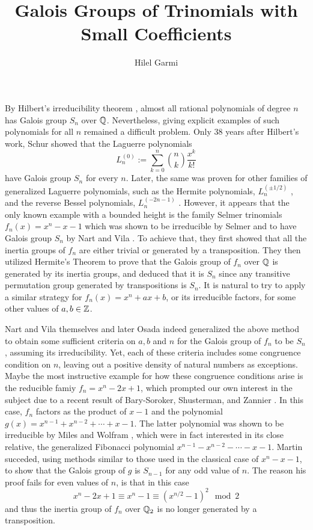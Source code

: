 \documentclass[../../main.tex]{subfiles}
\begin{document}
\title{
  Galois Groups of Trinomials with Small Coefficients
}
\author{Hilel Garmi}
\maketitle
By Hilbert's irreducibility theorem \cite{Hilbert}, almost all rational polynomials of degree $n$ has Galois group $S_n$ over $\mathbb{Q}$.
Nevertheless, giving explicit examples of such polynomials for all $n$ remained a difficult problem.
Only 38 years after Hilbert's work, Schur \cite{schur1931affectless} showed that the Laguerre polynomials 
\[
  L_n^{\left( 0 \right)} := \sum_{k=0}^n \binom{n}{k} \frac{x^k}{k!}
\]
have Galois group $S_n$ for every $n$.
Later, the same was proven for other families of generalized Laguerre polynomials, such as the Hermite polynomials, $L^{\left( \pm 1/2 \right)}_n$ \cite{schur1931affectless}, and the reverse Bessel polynomials, $L^{\left( -2n-1 \right)}_n$ \cite{grosswald1978bessel} \cite{filaseta2002irreducibility}.
However, it appears that the only known example with a bounded height is the family Selmer trinomials $f_n\left( x \right) = x^n - x - 1$  which was shown to be irreducible by Selmer \cite{SelmerIrreducibility1956} and to have Galois group $S_n$ by Nart and Vila \cite{NartVila1979}.
To achieve that, they first showed that all the inertia groups of $f_n$ are either trivial or generated by a transposition.
They then utilized Hermite's Theorem to prove that the Galois group of $f_n$ over $\mathbb{Q}$ is generated by its inertia groups, and deduced that it is $S_n$ since any transitive permutation group generated by transpositions is $S_n$.
It is natural to try to apply a similar strategy for $f_n\left( x \right) = x^n + ax + b$, or its irreducible factors, for some other values of $a,b \in \mathbb{Z}$.

Nart and Vila \cite{NartVila1979} themselves and later Osada \cite{Osada1987TheGG} indeed generalized the above method to obtain some sufficient criteria on $a,b$ and $n$ for the Galois group of $f_n$ to be $S_n$, assuming its irreducibility.
Yet, each of these criteria includes some congruence condition on $n$, leaving out a positive density of natural numbers as exceptions.
Maybe the most instructive example for how these congruence conditions arise is the  reducible famiy $f_n = x^n - 2x + 1$, which prompted our own interest in the subject due to a recent result of Bary-Soroker, Shusterman, and Zannier \cite[Appendix A]{Soroker_appendix_2017}.
In this case, $f_n$ factors as the product of $x-1$ and the polynomial $g\left( x \right) = x^{n-1} + x^{n-2} + \cdots + x - 1$.
The latter polynomial was shown to be irreducible by Miles \cite{Miles1960} and Wolfram \cite{Wolfram1998}, which were in fact interested in its close relative, the generalized Fibonacci polynomial $x^{n-1} - x^{n-2} - \cdots - x - 1$.
Martin \cite{MARTIN2004213} succeded, using methods similar to those used in the classical case of $x^n - x - 1$, to show that the Galois group of $g$ is $S_{n-1}$ for any odd value of $n$.
The reason his proof fails for even values of $n$, is that in this case 
\[
  x^n - 2x + 1 \equiv x^n - 1 \equiv \left( x^{n/2} - 1\right)^2 \mod 2
\]
and thus the inertia group of $f_n$ over $\mathbb{Q}_2$ is no longer generated by a transposition.
\end{document}
